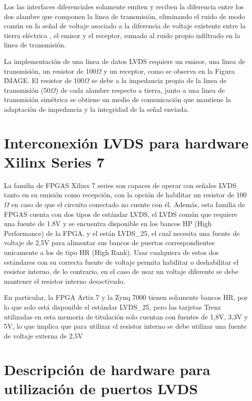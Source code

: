 	Los las interfaces diferenciales solamente emiten y reciben la diferencia entre los dos alambre que componen la linea de transmisión, eliminando el ruido de modo común en la señal de voltaje asociado a la diferencia de voltaje existente entre la tierra eléctrica , el emisor y el receptor, sumado al ruido propio infiltrado en la linea de transmisión.
	
	La implementación de una linea de datos LVDS requiere un emisor, una linea de transmisión, un resistor de 100$\Omega$ y un receptor, como se observa en la Figura IMAGE. El resistor de 100$\Omega$ se debe a la impedancia propia de la linea de transmisión (50$\Omega$) de cada alambre respecto a tierra, junto a una linea de transmisión simétrica se obtiene un medio de comunicación que mantiene la adaptación de impedancia y la integridad de la señal enviada. 


\section{Interconexión LVDS para hardware Xilinx Series 7}

	La familia de FPGAS Xilinx 7 series son capaces de operar con señales LVDS tanto en su emisión como recepción, con la opción de habilitar un resistor de 100$\Omega$ en caso de que el circuito conectado no cuente con él. Además, esta familia de FPGAS cuenta con dos tipos de estándar LVDS, el LVDS común que requiere una fuente de 1.8V y se encuentra disponible en los bancos HP (High Performance) de la FPGA, y el están LVDS\_25, el cual necesita una fuente de voltaje de 2,5V para alimentar sus bancos de puertos correspondientes unicamente a los de tipo HR (High Rank). Usar cualquiera de estos dos estándares con su correcta fuente de voltaje permita habilitar o deshabilitar el resistor interno, de lo contrario, en el caso de usar un voltaje diferente se debe mantener el resistor interno desactivado.
	
	En particular, la FPGA Artix 7 y la Zynq 7000 tienen solamente bancos HR, por lo que solo está disponible el estándar LVDS\_25, pero las tarjetas Trenz utilizadas en esta memoria de titulación solo cuentan con fuentes de 1,8V, 3,3V y 5V, lo que implica que para utilizar el resistor interno se debe utilizar una fuente de voltaje externa de 2,5V

\section{Descripción de hardware para utilización de puertos LVDS}

